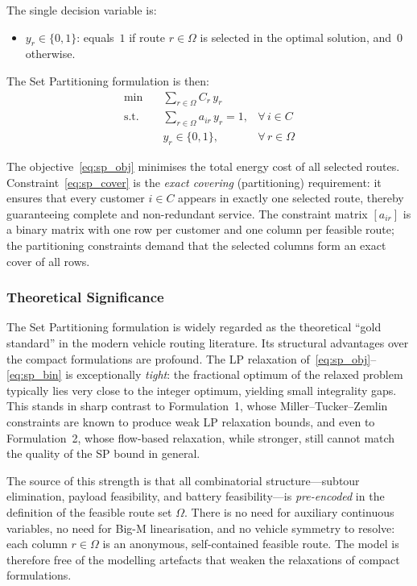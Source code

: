 \documentclass[11pt,a4paper]{article}
\begin{document}
\noindent The single decision variable is:
\begin{itemize}
  \item $y_r \in \{0, 1\}$: equals~$1$ if route $r \in \Omega$ is selected in the optimal solution, and~$0$ otherwise.
\end{itemize}

\noindent The Set Partitioning formulation is then:
\begin{align}
  \min \quad & \sum_{r \in \Omega} C_r \, y_r \label{eq:sp_obj}\\[6pt]
  \text{s.t.} \quad & \sum_{r \in \Omega} a_{ir} \, y_r = 1, & \forall\, i \in C \label{eq:sp_cover}\\
  & y_r \in \{0, 1\}, & \forall\, r \in \Omega \label{eq:sp_bin}
\end{align}

The objective~\eqref{eq:sp_obj} minimises the total energy cost of all selected routes. Constraint~\eqref{eq:sp_cover} is the \emph{exact covering} (partitioning) requirement: it ensures that every customer $i \in C$ appears in exactly one selected route, thereby guaranteeing complete and non-redundant service. The constraint matrix $[a_{ir}]$ is a binary matrix with one row per customer and one column per feasible route; the partitioning constraints demand that the selected columns form an exact cover of all rows.

\subsubsection{Theoretical Significance}

The Set Partitioning formulation is widely regarded as the theoretical ``gold standard'' in the modern vehicle routing literature. Its structural advantages over the compact formulations are profound. The LP relaxation of~\eqref{eq:sp_obj}--\eqref{eq:sp_bin} is exceptionally \emph{tight}: the fractional optimum of the relaxed problem typically lies very close to the integer optimum, yielding small integrality gaps. This stands in sharp contrast to Formulation~1, whose Miller--Tucker--Zemlin constraints are known to produce weak LP relaxation bounds, and even to Formulation~2, whose flow-based relaxation, while stronger, still cannot match the quality of the SP bound in general.

The source of this strength is that all combinatorial structure---subtour elimination, payload feasibility, and battery feasibility---is \emph{pre-encoded} in the definition of the feasible route set $\Omega$. There is no need for auxiliary continuous variables, no need for Big-M linearisation, and no vehicle symmetry to resolve: each column $r \in \Omega$ is an anonymous, self-contained feasible route. The model is therefore free of the modelling artefacts that weaken the relaxations of compact formulations.
\end{document}
